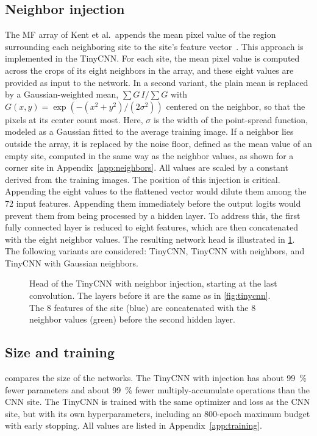 \subsection{Neighbor injection} The MF array of Kent et al.\ appends the mean pixel value of the region surrounding each neighboring site to the site's feature vector~\cite{kent2025}. This approach is implemented in the TinyCNN.
For each site, the mean pixel value is computed across the crops of its eight neighbors in the array, and these eight values are provided as input to the network. In a second variant, the plain mean is replaced by a Gaussian-weighted mean, $\sum G\,I / \sum G$ with $G(x,y) = \exp(-(x^2+y^2)/(2\sigma^2))$ centered on the neighbor, so that the pixels at its center count most. Here, $\sigma$ is the width of the point-spread function, modeled as a Gaussian fitted to the average training image. If a neighbor lies outside the array, it is replaced by the noise floor, defined as the mean value of an empty site, computed in the same way as the neighbor values, as shown for a corner site in Appendix~\ref{app:neighbors}.
All values are scaled by a constant derived from the training images. The position of this injection is critical. Appending the eight values to the flattened vector would dilute them among the 72 input features. Appending them immediately before the output logits would prevent them from being processed by a hidden layer. To address this, the first fully connected layer is reduced to eight features, which are then concatenated with the eight neighbor values. The resulting network head is illustrated in \cref{fig:tinycnn-injection}. The following variants are considered: TinyCNN, TinyCNN with neighbors, and TinyCNN with Gaussian neighbors.

\begin{figure}[H]
    \centering
    \resizebox{0.75\textwidth}{!}{}
    \caption[Head of the TinyCNN with neighbor injection, starting at the last convolution.]{Head of the TinyCNN with neighbor injection, starting at the last convolution. The layers before it are the same as in \cref{fig:tinycnn}. The 8 features of the site (blue) are concatenated with the 8 neighbor values (green) before the second hidden layer.}
    \label{fig:tinycnn-injection}
\end{figure}

\subsection{Size and training}  compares the size of the networks. The TinyCNN with injection has about \SI{99}{\percent} fewer parameters and about \SI{99}{\percent} fewer multiply-accumulate operations than the CNN site. The TinyCNN is trained with the same optimizer and loss as the CNN site, but with its own hyperparameters, including an 800-epoch maximum budget with early stopping. All values are listed in Appendix~\ref{app:training}.

